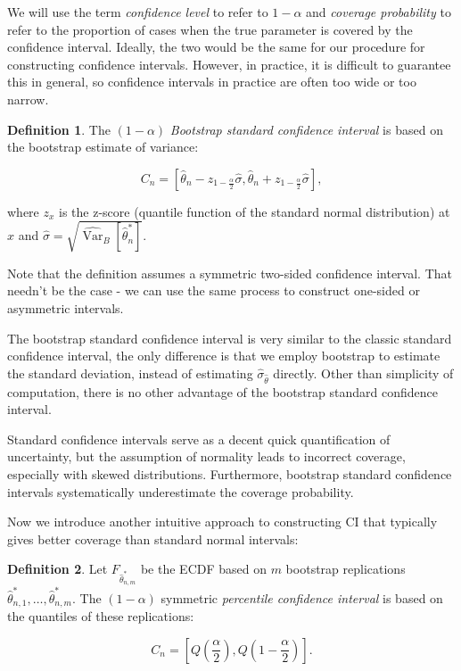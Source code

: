\documentclass{book}
\theoremstyle{plain}%
\theoremstyle{definition}
\newtheorem{definition}{Definition}[section]
\DeclareMathOperator{\Var}{Var}
\newlength{\arrow}
\begin{document}
We will use the term \emph{confidence level} to refer to $1 - \alpha$ and \emph{coverage probability} to refer to the proportion of
cases when the true parameter is covered by the confidence interval. Ideally, the two would be the same for our procedure for constructing confidence intervals. However, in practice, it is difficult to guarantee this in general, so confidence intervals in practice are often too wide or too narrow.

\begin{definition} The $(1 - \alpha)$ \emph{Bootstrap standard confidence interval} is based on the bootstrap estimate of variance:

$$C_n = [\hat{\theta}_n - z_{1-\frac{ \alpha}{2}}\hat{\sigma},\hat{\theta}_n + z_{1-\frac{ \alpha}{2}}\hat{\sigma}],$$

where $z_x$ is the z-score (quantile function of the  standard normal distribution) at $x$ and $\hat{\sigma} = \sqrt{\widehat{\Var}_B[\hat{\theta}^*_n]}$.
\end{definition}

Note that the definition assumes a symmetric two-sided confidence interval. That needn't be the case - we can use the same process to construct one-sided or asymmetric intervals.

The bootstrap standard confidence interval is very similar to the classic standard confidence interval, the only difference is that we employ bootstrap to estimate the standard deviation, instead of estimating $\hat{\sigma}_{\hat{\theta}}$ directly. Other than simplicity of computation, there is no other advantage of the bootstrap standard confidence interval.

Standard confidence intervals serve as a decent quick quantification of uncertainty, but the assumption of normality leads to incorrect coverage, especially with skewed distributions. Furthermore, bootstrap standard confidence intervals systematically underestimate the coverage probability.

Now we introduce another intuitive approach to constructing CI that typically gives better coverage than standard normal intervals:

\begin{definition} Let $F_{\hat{\theta}^*_{n,m}}$ be the ECDF based on $m$ bootstrap replications $\hat{\theta}^*_{n,1},\dots, \hat{\theta}^*_{n,m}$. The $(1 - \alpha)$ symmetric \emph{percentile confidence interval} is based on the quantiles of these replications:

$$C_n = [Q(\frac{\alpha}{2}),Q(1-\frac{\alpha}{2})].$$
\end{definition}
\end{document}
